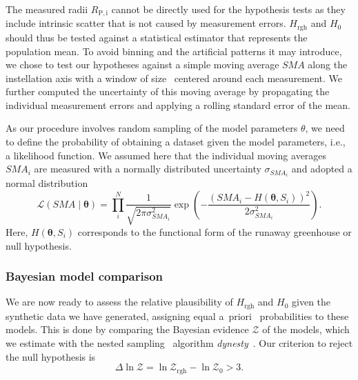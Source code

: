 \documentclass[modern]{aastex631}
\begin{document}
The measured radii $R_\mathrm{P, i}$ cannot be directly used for the hypothesis tests as they include intrinsic scatter that is not caused by measurement errors.
$H_{\mathrm{rgh}}$ and $H_0$ should thus be tested against a statistical estimator that represents the population mean.
To avoid binning and the artificial patterns it may introduce, we chose to test our hypotheses against a simple moving average $SMA$ along the instellation axis with a window of size \windowsize\ centered around each measurement.
We further computed the uncertainty of this moving average by propagating the individual measurement errors and applying a rolling standard error of the mean. 

As our procedure involves random sampling of the model parameters $\theta$, we need to define the probability of obtaining a dataset given the model parameters, i.e., a likelihood function.
We assumed here that the individual moving averages $SMA_i$ are measured with a normally distributed uncertainty $\sigma_{SMA_i}$ and adopted a normal distribution
\begin{equation}
    \mathcal{L}(SMA \mid \boldsymbol{\theta})=\prod_{i}^{N} \frac{1}{\sqrt{2 \pi \sigma_{SMA_i}^{2}}} \exp \left(-\frac{\left(SMA_i - H\left(\boldsymbol{\theta}, S_i\right)\right)^{2}}{2 \sigma_{SMA_i}^{2}}\right).
\end{equation}
Here, $H\left(\boldsymbol{\theta}, S_i\right)$ corresponds to the functional form of the runaway greenhouse or null hypothesis.



\subsubsection{Bayesian model comparison}
We are now ready to assess the relative plausibility of $H_{\mathrm{rgh}}$ and $H_0$ given the synthetic data we have generated, assigning equal a~priori~ probabilities to these models.
This is done by comparing the Bayesian evidence $\mathcal{Z}$ of the models, which we estimate with the nested sampling~\citep{Skilling2004} algorithm \emph{dynesty}~\citep{Speagle2020}.
Our criterion to reject the null hypothesis is
\begin{equation}
\Delta \ln \mathcal{Z}  = \ln \mathcal{Z}_\mathrm{rgh} - \ln \mathcal{Z}_0  > 3.
\end{equation}
\end{document}

